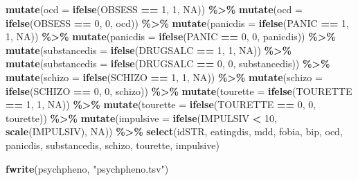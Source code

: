 \documentclass[
]{article}
\newenvironment{Shaded}{\begin{snugshade}}{\end{snugshade}}
\newcommand{\AttributeTok}[1]{\textcolor[rgb]{0.13,0.29,0.53}{#1}}
\newcommand{\ConstantTok}[1]{\textcolor[rgb]{0.56,0.35,0.01}{#1}}
\newcommand{\DecValTok}[1]{\textcolor[rgb]{0.00,0.00,0.81}{#1}}
\newcommand{\FunctionTok}[1]{\textcolor[rgb]{0.13,0.29,0.53}{\textbf{#1}}}
\newcommand{\NormalTok}[1]{#1}
\newcommand{\SpecialCharTok}[1]{\textcolor[rgb]{0.81,0.36,0.00}{\textbf{#1}}}
\newcommand{\StringTok}[1]{\textcolor[rgb]{0.31,0.60,0.02}{#1}}
\begin{document}
\begin{Shaded}
\begin{Highlighting}[]
  \FunctionTok{mutate}\NormalTok{(}\AttributeTok{ocd =} \FunctionTok{ifelse}\NormalTok{(OBSESS }\SpecialCharTok{==} \DecValTok{1}\NormalTok{, }\DecValTok{1}\NormalTok{, }\ConstantTok{NA}\NormalTok{)) }\SpecialCharTok{\%\textgreater{}\%} 
  \FunctionTok{mutate}\NormalTok{(}\AttributeTok{ocd =} \FunctionTok{ifelse}\NormalTok{(OBSESS }\SpecialCharTok{==} \DecValTok{0}\NormalTok{, }\DecValTok{0}\NormalTok{, ocd)) }\SpecialCharTok{\%\textgreater{}\%} 
  \FunctionTok{mutate}\NormalTok{(}\AttributeTok{panicdis =} \FunctionTok{ifelse}\NormalTok{(PANIC }\SpecialCharTok{==} \DecValTok{1}\NormalTok{, }\DecValTok{1}\NormalTok{, }\ConstantTok{NA}\NormalTok{)) }\SpecialCharTok{\%\textgreater{}\%} 
  \FunctionTok{mutate}\NormalTok{(}\AttributeTok{panicdis =} \FunctionTok{ifelse}\NormalTok{(PANIC }\SpecialCharTok{==} \DecValTok{0}\NormalTok{, }\DecValTok{0}\NormalTok{, panicdis)) }\SpecialCharTok{\%\textgreater{}\%}   
  \FunctionTok{mutate}\NormalTok{(}\AttributeTok{substancedis =} \FunctionTok{ifelse}\NormalTok{(DRUGSALC }\SpecialCharTok{==} \DecValTok{1}\NormalTok{, }\DecValTok{1}\NormalTok{, }\ConstantTok{NA}\NormalTok{)) }\SpecialCharTok{\%\textgreater{}\%} 
  \FunctionTok{mutate}\NormalTok{(}\AttributeTok{substancedis =} \FunctionTok{ifelse}\NormalTok{(DRUGSALC }\SpecialCharTok{==} \DecValTok{0}\NormalTok{, }\DecValTok{0}\NormalTok{, substancedis)) }\SpecialCharTok{\%\textgreater{}\%} 
  \FunctionTok{mutate}\NormalTok{(}\AttributeTok{schizo =} \FunctionTok{ifelse}\NormalTok{(SCHIZO }\SpecialCharTok{==} \DecValTok{1}\NormalTok{, }\DecValTok{1}\NormalTok{, }\ConstantTok{NA}\NormalTok{)) }\SpecialCharTok{\%\textgreater{}\%} 
  \FunctionTok{mutate}\NormalTok{(}\AttributeTok{schizo =} \FunctionTok{ifelse}\NormalTok{(SCHIZO }\SpecialCharTok{==} \DecValTok{0}\NormalTok{, }\DecValTok{0}\NormalTok{, schizo)) }\SpecialCharTok{\%\textgreater{}\%} 
  \FunctionTok{mutate}\NormalTok{(}\AttributeTok{tourette =} \FunctionTok{ifelse}\NormalTok{(TOURETTE }\SpecialCharTok{==} \DecValTok{1}\NormalTok{, }\DecValTok{1}\NormalTok{, }\ConstantTok{NA}\NormalTok{)) }\SpecialCharTok{\%\textgreater{}\%} 
  \FunctionTok{mutate}\NormalTok{(}\AttributeTok{tourette =} \FunctionTok{ifelse}\NormalTok{(TOURETTE }\SpecialCharTok{==} \DecValTok{0}\NormalTok{, }\DecValTok{0}\NormalTok{, tourette)) }\SpecialCharTok{\%\textgreater{}\%} 
  \FunctionTok{mutate}\NormalTok{(}\AttributeTok{impulsive =} \FunctionTok{ifelse}\NormalTok{(IMPULSIV }\SpecialCharTok{\textless{}} \DecValTok{10}\NormalTok{, }\FunctionTok{scale}\NormalTok{(IMPULSIV), }\ConstantTok{NA}\NormalTok{)) }\SpecialCharTok{\%\textgreater{}\%} 
  \FunctionTok{select}\NormalTok{(idSTR, eatingdis, mdd, fobia, bip, ocd, panicdis, substancedis, schizo, tourette, impulsive)}

\FunctionTok{fwrite}\NormalTok{(psychpheno, }\StringTok{"psychpheno.tsv"}\NormalTok{)}
\end{Highlighting}
\end{Shaded}
\end{document}
